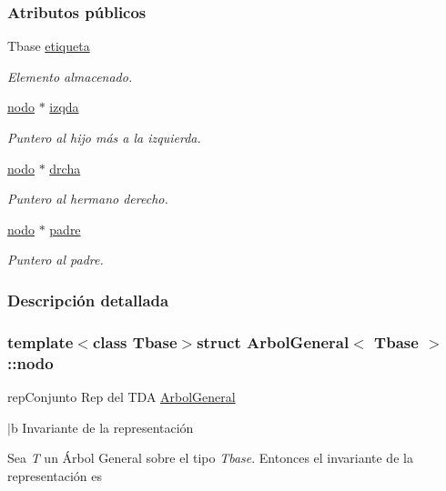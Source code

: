 \subsubsection*{Atributos públicos}
\begin{DoxyCompactItemize}
\item 
Tbase \hyperlink{structArbolGeneral_1_1nodo_ab7223965c5a62aa93895f3decd7a109a}{etiqueta}
\begin{DoxyCompactList}\small\item\em Elemento almacenado. \end{DoxyCompactList}\item 
\hyperlink{structArbolGeneral_1_1nodo}{nodo} $\ast$ \hyperlink{structArbolGeneral_1_1nodo_a3b8075b9fd0dc27c2272ba48bd9a9221}{izqda}
\begin{DoxyCompactList}\small\item\em Puntero al hijo más a la izquierda. \end{DoxyCompactList}\item 
\hyperlink{structArbolGeneral_1_1nodo}{nodo} $\ast$ \hyperlink{structArbolGeneral_1_1nodo_a8d0a58447171461212942f9308ef4f36}{drcha}
\begin{DoxyCompactList}\small\item\em Puntero al hermano derecho. \end{DoxyCompactList}\item 
\hyperlink{structArbolGeneral_1_1nodo}{nodo} $\ast$ \hyperlink{structArbolGeneral_1_1nodo_ab4d70a0179e8450b2842bbf1a6481402}{padre}
\begin{DoxyCompactList}\small\item\em Puntero al padre. \end{DoxyCompactList}\end{DoxyCompactItemize}


\subsubsection{Descripción detallada}
\subsubsection*{template$<$class Tbase$>$struct Arbol\-General$<$ Tbase $>$\-::nodo}

rep\-Conjunto Rep del T\-D\-A \hyperlink{classArbolGeneral}{Arbol\-General} 

$\vert$b Invariante de la representación

Sea {\itshape T} un Árbol General sobre el tipo {\itshape Tbase}. Entonces el invariante de la representación es

